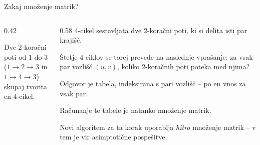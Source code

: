 \documentclass[aspectratio=169,10pt]{beamer}
\begin{document}
\begin{frame}{Zakaj množenje matrik?}
  \begin{columns}[T,onlytextwidth]
    \begin{column}{0.42\textwidth}
      \centering
      \vspace{0.8em}

      \vspace{0.6em}
      {\small Dve 2-koračni poti od $1$ do $3$\\
      (\textcolor{blue!70!black}{$1\!\to\!2\!\to\!3$} in \textcolor{red!70!black}{$1\!\to\!4\!\to\!3$})\\
      \alert{skupaj tvorita en 4-cikel.}}
    \end{column}
    \begin{column}{0.58\textwidth}
      4-cikel sestavljata \alert{dve 2-koračni poti, ki si delita isti par krajišč}.

      \medskip
      Štetje 4-ciklov se torej prevede na naslednje vprašanje: za vsak par vozlišč $(u, v)$, koliko 2-koračnih poti poteka med njima?

      \medskip
      Odgovor je tabela, indeksirana s pari vozlišč -- po en vnos za vsak par.

      \medskip
      \alert{Računanje te tabele je natanko množenje matrik.}

      \medskip
      Novi algoritem za ta korak uporablja \emph{hitro} množenje matrik -- v tem je vir asimptotične pospešitve.
    \end{column}
  \end{columns}
\end{frame}
\end{document}

